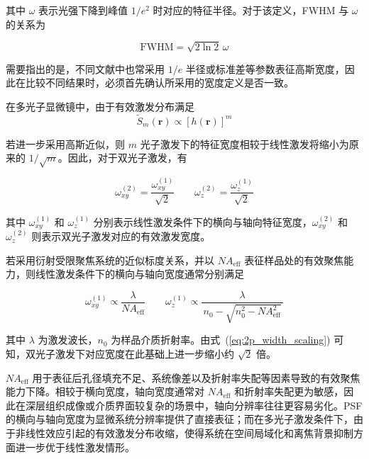 其中 $\omega$ 表示光强下降到峰值 $1/e^2$ 时对应的特征半径。对于该定义，FWHM 与 $\omega$ 的关系为

\begin{equation}
  \mathrm{FWHM}=\sqrt{2\ln 2}\,\omega
  \label{eq:fwhm_omega_relation}
\end{equation}

需要指出的是，不同文献中也常采用 $1/e$ 半径或标准差等参数表征高斯宽度，因此在比较不同结果时，必须首先确认所采用的宽度定义是否一致。

在多光子显微镜中，由于有效激发分布满足
\begin{equation}
  \widetilde S_m(\mathbf r)\propto [h(\mathbf r)]^m
\end{equation}

若进一步采用高斯近似，则 $m$ 光子激发下的特征宽度相较于线性激发将缩小为原来的 $1/\sqrt m$。因此，对于双光子激发，有

\begin{equation}
  \omega_{xy}^{(2)}=\frac{\omega_{xy}^{(1)}}{\sqrt2} \qquad
  \omega_{z}^{(2)}=\frac{\omega_{z}^{(1)}}{\sqrt2}
  \label{eq:2p_width_scaling}
\end{equation}

其中 $\omega_{xy}^{(1)}$ 和 $\omega_{z}^{(1)}$ 分别表示线性激发条件下的横向与轴向特征宽度，$\omega_{xy}^{(2)}$ 和 $\omega_{z}^{(2)}$ 则表示双光子激发对应的有效激发宽度。

若采用衍射受限聚焦系统的近似标度关系，并以 $NA_{\mathrm{eff}}$ 表征样品处的有效聚焦能力，则线性激发条件下的横向与轴向宽度通常分别满足

\begin{equation}
  \omega_{xy}^{(1)} \propto \frac{\lambda}{NA_{\mathrm{eff}}}
  \qquad
  \omega_{z}^{(1)} \propto \frac{\lambda}{\,n_0-\sqrt{n_0^2-NA_{\mathrm{eff}}^2}\,}
  \label{eq:linear_width_scaling}
\end{equation}

其中 $\lambda$ 为激发波长，$n_0$ 为样品介质折射率。由式~(\ref{eq:2p_width_scaling}) 可知，双光子激发下对应宽度在此基础上进一步缩小约 $\sqrt2$ 倍。

$NA_{\mathrm{eff}}$ 用于表征后孔径填充不足、系统像差以及折射率失配等因素导致的有效聚焦能力下降。相较于横向宽度，轴向宽度通常对 $NA_{\mathrm{eff}}$ 和折射率失配更为敏感，因此在深层组织成像或介质界面较复杂的场景中，轴向分辨率往往更容易劣化。PSF 的横向与轴向宽度为显微系统分辨率提供了直接表征；而在多光子激发条件下，由于非线性效应引起的有效激发分布收缩，使得系统在空间局域化和离焦背景抑制方面进一步优于线性激发情形。



